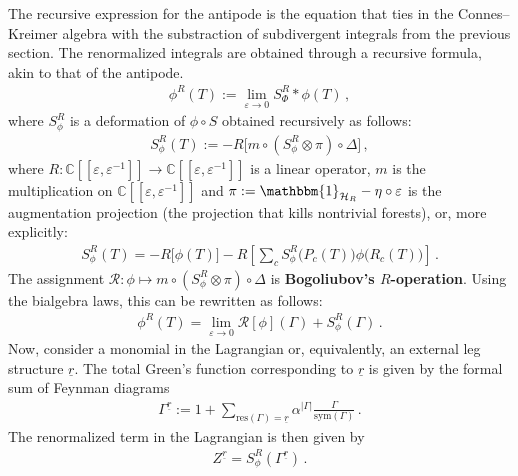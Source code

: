     The recursive expression for the antipode is the equation that ties in the Connes--Kreimer algebra with the substraction of subdivergent integrals from the previous section. The renormalized integrals are obtained through a recursive formula, akin to that of the antipode.
    \begin{gather}
        \phi^R(T) := \lim_{\varepsilon\rightarrow0} S_\Phi^R\ast\phi(T)\,,
    \end{gather}
    where $S_\phi^R$ is a deformation of $\phi\circ S$ obtained recursively as follows:
    \begin{gather}
        S_\phi^R(T) := -R\bigl[m\circ(S_\phi^R\otimes\pi)\circ\Delta\bigr]\,,
    \end{gather}
    where $R:\mathbb{C}[[\varepsilon,\varepsilon^{-1}]]\rightarrow\mathbb{C}[[\varepsilon,\varepsilon^{-1}]]$ is a linear operator, $m$ is the multiplication on $\mathbb{C}[[\varepsilon,\varepsilon^{-1}]]$ and $\pi:=\mathbbm{1}_{\mathcal{H}_R}-\eta\circ\varepsilon$ is the augmentation projection (the projection that kills nontrivial forests), or, more explicitly:
    \begin{gather}
        S_\phi^R(T) = -R\bigl[\phi(T)\bigr] - R\left[\sum_cS_\phi^R\bigl(P_c(T)\bigr)\phi\bigl(R_c(T)\bigr)\right]\,.
    \end{gather}
    The assignment $\mathcal{R}:\phi\mapsto m\circ(S_\phi^R\otimes\pi)\circ\Delta$ is \textbf{Bogoliubov's $R$-operation}. Using the bialgebra laws, this can be rewritten as follows:
    \begin{gather}
        \phi^R(T) = \lim_{\varepsilon\rightarrow0}\mathcal{R}[\phi](\Gamma)+S_\phi^R(\Gamma)\,.
    \end{gather}
    Now, consider a monomial in the Lagrangian or, equivalently, an external leg structure $\underline{r}$. The total Green's function corresponding to $\underline{r}$ is given by the formal sum of Feynman diagrams
    \begin{gather}
        \Gamma^{\underline{r}} := 1 + \sum_{\mathrm{res}(\Gamma)=\underline{r}}\alpha^{|\Gamma|}\frac{\Gamma}{\mathrm{sym}(\Gamma)}\,.
    \end{gather}
    The renormalized term in the Lagrangian is then given by
    \begin{gather}
        Z^{\underline{r}} = S_\phi^R(\Gamma^{\underline{r}})\,.
    \end{gather}
    
